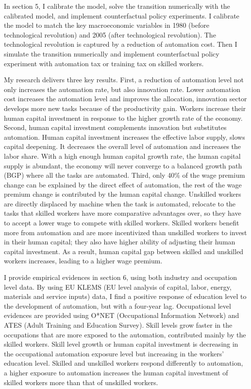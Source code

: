 \documentclass[12pt]{article}
\begin{document}
In section 5, I calibrate the model, solve the transition numerically with the calibrated model, and implement counterfactual policy experiments. I calibrate the model to match the key macroeconomic variables in 1980 (before technological revolution) and 2005 (after technological revolution). The technological revolution is captured by a reduction of automation cost. Then I simulate the transition numerically and implement counterfactual policy experiment with automation tax or training tax on skilled workers. 

My research delivers three key results. First, a reduction of automation level not only increases the automation rate, but also innovation rate. Lower automation cost increases the automation level and improves the allocation, innovation sector develops more new tasks because of the productivity gain. Workers increase their human capital investment in response to the higher growth rate of the economy. Second, human capital investment complements innovation but substitutes automation. Human capital investment increases the effective labor supply, slows capital deepening. It decreases the overall level of automation and increases the labor share. With a high enough human capital growth rate, the human capital supply is abundant, the economy will never converge to a balanced growth path (BGP) where all the tasks are automated. Third, only 40\% of the wage premium change can be explained by the direct effect of automation, the rest of the wage premium change is contributed by the human capital change. Unskilled workers are directly displaced by machine when the task is automated, relocate to the tasks that skilled workers have more comparative advantages over, so they have to accept a lower wage to compete with skilled workers. Skilled workers benefit more from automation and are more incentivized than unskilled workers to invest in their human capital; they also have higher ability of adjusting their human capital investment. As a result, human capital gap between skilled and unskilled workers increases, leading to a higher wage premium. 

I provide empirical evidences in section 6, using both industry and occupation level data. By using EU KLEMS (EU level analysis of capital, labor, energy, materials and service inputs) data, I find a positive response of education level to the development of automation, but with a four-year lag. Occupational level evidences are provided using O*NET (Occupational Information Network) and ATES (Adult Training and Education Survey). Skill levels grow faster in the occupations that are more exposed to the automation, contributed mainly by the skilled workers. Skill level growth or human capital investment is decreasing in the occupational automation exposure level but increasing in the workers' education level. Skilled and unskilled workers respond differently to automation, a higher exposure to automation increases the human capital investment of skilled workers more than that of unskilled workers. 
\end{document}
